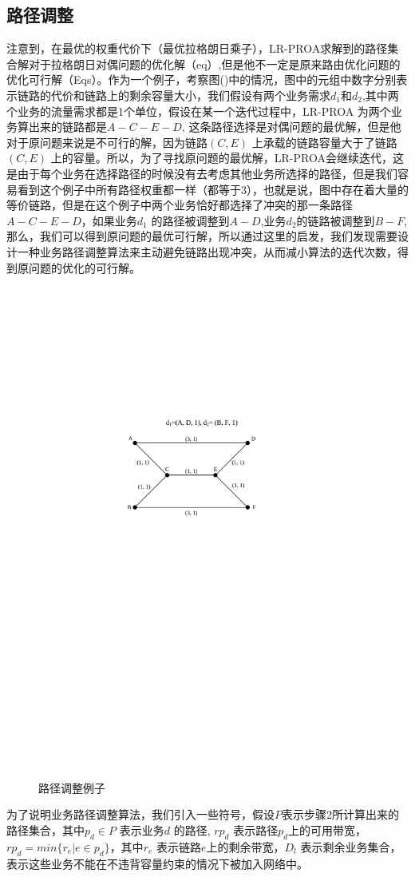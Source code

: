 \subsection{路径调整}
  注意到，在最优的权重代价下（最优拉格朗日乘子），LR-PROA求解到的路径集合解对于拉格朗日对偶问题的优化解（eq）,但是他不一定是原来路由优化问题的优化可行解（Eqs）。作为一个例子，考察图()中的情况，图中的元组中数字分别表示链路的代价和链路上的剩余容量大小，我们假设有两个业务需求$d_1$和$d_2$,其中两个业务的流量需求都是1个单位，假设在某一个迭代过程中，LR-PROA 为两个业务算出来的链路都是$A-C-E-D$, 这条路径选择是对偶问题的最优解，但是他对于原问题来说是不可行的解，因为链路$(C,E)$ 上承载的链路容量大于了链路$(C,E)$ 上的容量。所以，为了寻找原问题的最优解，LR-PROA会继续迭代，这是由于每个业务在选择路径的时候没有去考虑其他业务所选择的路径，但是我们容易看到这个例子中所有路径权重都一样（都等于3），也就是说，图中存在着大量的等价链路，但是在这个例子中两个业务恰好都选择了冲突的那一条路径$A-C-E-D$，如果业务$d_1$ 的路径被调整到$A-D$,业务$d_2$的链路被调整到$B-F$, 那么，我们可以得到原问题的最优可行解，所以通过这里的启发，我们发现需要设计一种业务路径调整算法来主动避免链路出现冲突，从而减小算法的迭代次数，得到原问题的优化的可行解。
\begin{figure}
\setlength{\belowcaptionskip}{-0.1cm}
  \begin{center}
    {\includegraphics[width=0.4 \textwidth]{figures/PathAdj.pdf}}
    \end{center}
  \caption{{\footnotesize{路径调整例子}}}
  \label{IterNum}
\end{figure}
为了说明业务路径调整算法，我们引入一些符号，假设$P$表示步骤2所计算出来的路径集合，其中$p_d\in P$ 表示业务$d$ 的路径, $rp_{d}$ 表示路径$p_d$上的可用带宽，$rp_{d} = min\{r_e | e\in p_d\}$，其中$r_e$ 表示链路$e$上的剩余带宽，$D_l$ 表示剩余业务集合，表示这些业务不能在不违背容量约束的情况下被加入网络中。
